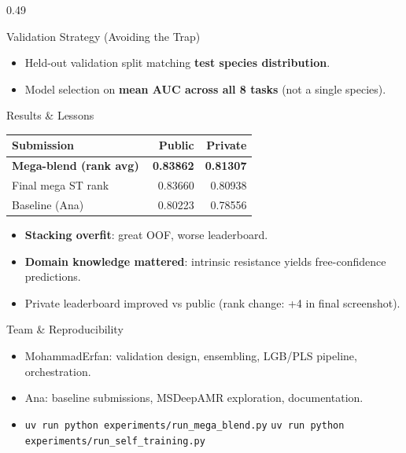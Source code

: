 \documentclass[final]{beamer}
\begin{document}
\begin{frame}[t]
\begin{columns}[t,totalwidth=\linewidth]
\begin{column}{0.49\linewidth}
\begin{block}{Validation Strategy (Avoiding the Trap)}
\begin{itemize}
  \item Held-out validation split matching \textbf{test species distribution}.
  \item Model selection on \textbf{mean AUC across all 8 tasks} (not a single species).
\end{itemize}
\end{block}

\begin{block}{Results \& Lessons}
\small
\begin{tabular}{@{}p{0.62\linewidth}rr@{}}
\toprule
\textbf{Submission} & \textbf{Public} & \textbf{Private} \\
\midrule
\textbf{Mega-blend (rank avg)} & \textbf{0.83862} & \textbf{0.81307} \\
Final mega ST rank & 0.83660 & 0.80938 \\
Baseline (Ana) & 0.80223 & 0.78556 \\
\bottomrule
\end{tabular}
\normalsize
\vspace{0.25cm}
\begin{itemize}
  \item \textbf{Stacking overfit}: great OOF, worse leaderboard.
  \item \textbf{Domain knowledge mattered}: intrinsic resistance yields free-confidence predictions.
  \item Private leaderboard improved vs public (rank change: +4 in final screenshot).
\end{itemize}
\end{block}

\begin{block}{Team \& Reproducibility}
\begin{itemize}
  \item MohammadErfan: validation design, ensembling, LGB/PLS pipeline, orchestration.
  \item Ana: baseline submissions, MSDeepAMR exploration, documentation.
  \item \texttt{uv run python experiments/run\_mega\_blend.py} \hspace{1em}
        \texttt{uv run python experiments/run\_self\_training.py}
\end{itemize}
\vspace{0.1cm}
\centering
{}
\end{block}

\end{column}

\end{columns}
\end{frame}
\end{document}
